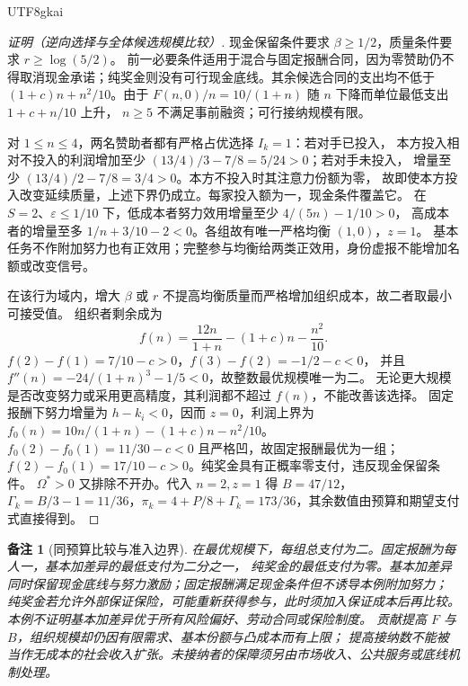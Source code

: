 \documentclass[12pt,a4paper,openany]{report}
\newtheorem{remark}{备注}[chapter]
\begin{document}
\begin{CJK*}{UTF8}{gkai}
\begin{proof}[证明（逆向选择与全体候选规模比较）]
现金保留条件要求 \(\beta\ge1/2\)，质量条件要求 \(r\ge\log(5/2)\)。
前一必要条件适用于混合与固定报酬合同，因为零赞助仍不得取消现金承诺；纯奖金则没有可行现金底线。其余候选合同的支出均不低于 \((1+c)n+n^2/10\)。由于
\(F(n,0)/n=10/(1+n)\) 随 \(n\) 下降而单位最低支出 \(1+c+n/10\) 上升，
\(n\ge5\) 不满足事前融资；可行接纳规模有限。

对 \(1\le n\le4\)，两名赞助者都有严格占优选择 \(I_k=1\)：若对手已投入，
本方投入相对不投入的利润增加至少 \((13/4)/3-7/8=5/24>0\)；若对手未投入，
增量至少 \((13/4)/2-7/8=3/4>0\)。本方不投入时其注意力份额为零，
故即使本方投入改变延续质量，上述下界仍成立。每家投入额为一，现金条件覆盖它。
在 \(S=2\)、\(\varepsilon\le1/10\) 下，低成本者努力效用增量至少 \(4/(5n)-1/10>0\)，
高成本者的增量至多 \(1/n+3/10-2<0\)。各组故有唯一严格均衡 \((1,0)\)，\(z=1\)。
基本任务不作附加努力也有正效用；完整参与均衡给两类正效用，身份虚报不能增加名额或改变信号。

在该行为域内，增大 \(\beta\) 或 \(r\) 不提高均衡质量而严格增加组织成本，故二者取最小可接受值。
组织者剩余成为
\[
 f(n)=\frac{12n}{1+n}-(1+c)n-\frac{n^2}{10}.
\]
\(f(2)-f(1)=7/10-c>0\)，\(f(3)-f(2)=-1/2-c<0\)，
并且 \(f''(n)=-24/(1+n)^3-1/5<0\)，故整数最优规模唯一为二。
无论更大规模是否改变努力或采用更高精度，其利润都不超过 \(f(n)\)，不能改善该选择。
固定报酬下努力增量为 \(h-k_i<0\)，因而 \(z=0\)，利润上界为
\(f_0(n)=10n/(1+n)-(1+c)n-n^2/10\)。
\(f_0(2)-f_0(1)=11/30-c<0\) 且严格凹，故固定报酬最优为一组；
\(f(2)-f_0(1)=17/10-c>0\)。纯奖金具有正概率零支付，违反现金保留条件。
\(\Omega^*>0\) 又排除不开办。代入 \(n=2,z=1\) 得 \(B=47/12\)，
\(\Gamma_k=B/3-1=11/36\)，\(\pi_k=4+P/8+\Gamma_k=173/36\)，其余数值由预算和期望支付式直接得到。
\end{proof}

\begin{remark}[同预算比较与准入边界]
在最优规模下，每组总支付为二。固定报酬为每人一，基本加差异的最低支付为二分之一，
纯奖金的最低支付为零。基本加差异同时保留现金底线与努力激励；固定报酬满足现金条件但不诱导本例附加努力；
纯奖金若允许外部保证保险，可能重新获得参与，此时须加入保证成本后再比较。
本例不证明基本加差异优于所有风险偏好、劳动合同或保险制度。
贡献提高 \(F\) 与 \(B\)，组织规模却仍因有限需求、基本份额与凸成本而有上限；
提高接纳数不能被当作无成本的社会收入扩张。未接纳者的保障须另由市场收入、公共服务或底线机制处理。
\end{remark}


\end{CJK*}
\end{document}
